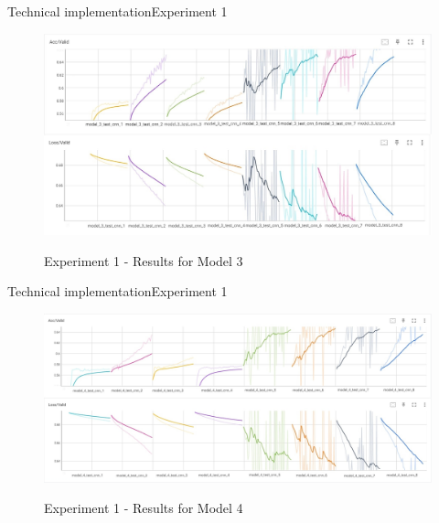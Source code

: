 \documentclass[
]{beamer}
\begin{document}
\begin{frame}{Technical implementation}{Experiment 1}

\begin{center}
    \begin{figure}[!h]
        \centering
        \includegraphics[width=\textwidth]{img/exp1_acc3+loss3.jpg}
        \label{fig:exp1_mod3}
        \caption{Experiment 1 - Results for Model 3}
    \end{figure}
\end{center}

\end{frame}



\begin{frame}{Technical implementation}{Experiment 1}

\begin{center}
    \begin{figure}[!h]
        \centering
        \includegraphics[width=\textwidth]{img/exp1_acc4+loss4.jpg}
        \label{fig:exp1_mod4}
        \caption{Experiment 1 - Results for Model 4}
    \end{figure}
\end{center}

\end{frame}
\end{document}

